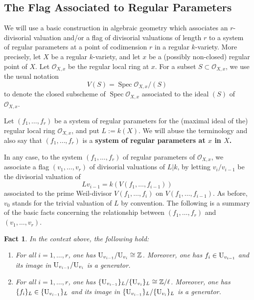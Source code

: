 \documentclass[11pt]{amsart}
\newtheorem{fact}[proposition]{Fact}
\theoremstyle{definition}
\theoremstyle{remark}
\numberwithin{equation}{section}
\DeclareMathOperator{\Spec}{Spec}
\newcommand{\Z}{\mathbb{Z}}
\newcommand{\U}{{\rm U}}
\newcommand{\Oc}{\mathcal{O}}
\begin{document}
\subsection{The Flag Associated to Regular Parameters}
\label{subsection: essram / regular-params-flags}

We will use a basic construction in algebraic geometry which associates an $r$-divisorial valuation and/or a flag of divisorial valuations of length $r$ to a system of regular parameters at a point of codimension $r$ in a regular $k$-variety.
More precisely, let $X$ be a regular $k$-variety, and let $x$ be a (possibly non-closed) regular point of $X$.
Let $\Oc_{X,x}$ be the regular local ring at $x$.
For a subset $S \subset \Oc_{X,x}$, we use the usual notation
\[ V(S) = \Spec \Oc_{X,x}/(S) \]
to denote the closed subscheme of $\Spec \Oc_{X,x}$ associated to the ideal $(S)$ of $\Oc_{X,x}$.

Let $(f_1,\ldots,f_r)$ be a system of regular parameters for the (maximal ideal of the) regular local ring $\Oc_{X,x}$, and put $L := k(X)$.
We will abuse the terminology and also say that $(f_1,\ldots,f_r)$ is a {\bf system of regular parameters at $x$ in $X$.}

In any case, to the system $(f_1,\ldots,f_r)$ of regular parameters of $\Oc_{X,x}$, we associate a flag $(v_1,\ldots,v_r)$ of divisorial valuations of $L|k$, by letting $v_i/v_{i-1}$ be the divisorial valuation of
\[ Lv_{i-1} = k(V(f_1,\ldots,f_{i-1})) \]
associated to the prime Weil-divisor $V(f_1,\ldots,f_i)$ on $V(f_1,\ldots,f_{i-1})$.
As before, $v_0$ stands for the trivial valuation of $L$ by convention.
The following is a summary of the basic facts concerning the relationship between $(f_1,\ldots,f_r)$ and $(v_1,\ldots,v_r)$.

\begin{fact}
\label{fact: essram / regular-params-flags / regular-params}
  In the context above, the following hold:
  \begin{enumerate}
    \item For all $i = 1,\ldots,r$, one has $\U_{v_{i-1}}/\U_{v_{i}} \cong \Z$.
    Moreover, one has $f_i \in \U_{v_{i-1}}$ and its image in $\U_{v_{i-1}}/\U_{v_i}$ is a generator.
    \item For all $i = 1,\ldots,r$, one has $\{\U_{v_{i-1}}\}_{L}/\{\U_{v_{i}}\}_{L} \cong \Z/\ell$.
    Moreover, one has $\{f_i\}_{L} \in \{\U_{v_{i-1}}\}_{L}$ and its image in $\{\U_{v_{i-1}}\}_{L}/\{\U_{v_{i}}\}_{L}$ is a generator.
  \end{enumerate}
\end{fact}
\end{document}
